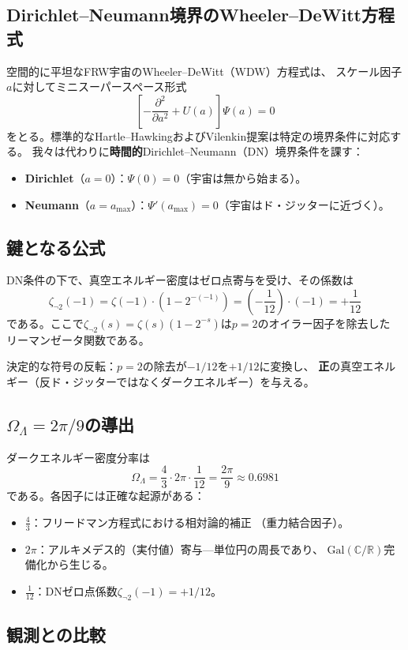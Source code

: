 \documentclass[12pt,a4paper]{article}
\theoremstyle{definition}
\newcommand{\Gal}{\mathrm{Gal}}
\newcommand{\R}{\mathbb{R}}
\newcommand{\C}{\mathbb{C}}
\newcommand{\OmL}{\Omega_\Lambda}
\newcommand{\zetanot}{\zeta_{\neg 2}}
\begin{document}
\subsection{Dirichlet--Neumann境界のWheeler--DeWitt方程式}

空間的に平坦なFRW宇宙のWheeler--DeWitt（WDW）方程式は、
スケール因子$a$に対してミニスーパースペース形式
\[
  \left[-\frac{\partial^2}{\partial a^2}+U(a)\right]\Psi(a)=0
\]
をとる。標準的なHartle--HawkingおよびVilenkin提案は特定の境界条件に対応する。
我々は代わりに\textbf{時間的}Dirichlet--Neumann（DN）境界条件を課す：
\begin{itemize}
\item \textbf{Dirichlet}（$a=0$）：$\Psi(0)=0$（宇宙は無から始まる）。
\item \textbf{Neumann}（$a=a_{\max}$）：$\Psi'(a_{\max})=0$（宇宙はド・ジッターに近づく）。
\end{itemize}

\subsection{鍵となる公式}

DN条件の下で、真空エネルギー密度はゼロ点寄与を受け、その係数は
\[
  \zetanot(-1) = \zeta(-1)\cdot(1-2^{-(-1)}) = \left(-\frac{1}{12}\right)\cdot(-1) = +\frac{1}{12}
\]
である。ここで$\zetanot(s)=\zeta(s)(1-2^{-s})$は$p=2$のオイラー因子を除去した
リーマンゼータ関数である。

決定的な符号の反転：$p=2$の除去が$-1/12$を$+1/12$に変換し、
\textbf{正}の真空エネルギー（反ド・ジッターではなくダークエネルギー）を与える。

\subsection{$\OmL=2\pi/9$の導出}

ダークエネルギー密度分率は
\[
  \boxed{\OmL = \frac{4}{3}\cdot 2\pi\cdot\frac{1}{12}=\frac{2\pi}{9}\approx 0.6981}
\]
である。各因子には正確な起源がある：
\begin{itemize}
\item $\frac{4}{3}$：フリードマン方程式における相対論的補正
  （重力結合因子）。
\item $2\pi$：アルキメデス的（実付値）寄与—単位円の周長であり、
  $\Gal(\C/\R)$完備化から生じる。
\item $\frac{1}{12}$：DNゼロ点係数$\zetanot(-1)=+1/12$。
\end{itemize}

\subsection{観測との比較}
\end{document}
